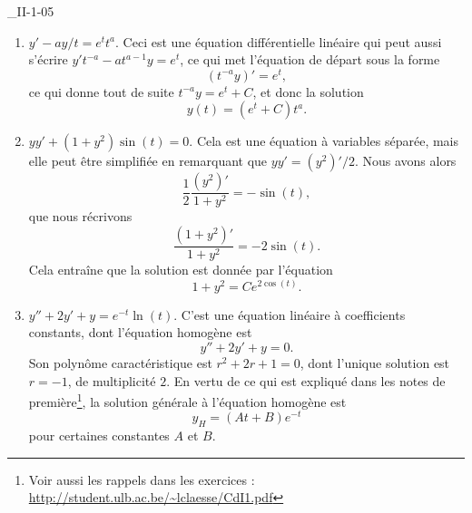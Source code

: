 \begin{corrige}{_II-1-05}
\begin{enumerate}
	\item $y'-ay/t=e^tt^a$.
Ceci est une équation différentielle linéaire qui peut aussi s'écrire $y't^{-a}-at^{a-1}y=e^t$, ce qui met l'équation de départ sous la forme
\begin{equation}
	(t^{-a}y)'=e^t,
\end{equation}
ce qui donne tout de suite $t^{-a}y=e^t+C$, et donc la solution
\begin{equation}
	y(t)=(e^t+C)t^a.
\end{equation}

	\item $yy'+(1+y^2)\sin(t)=0$.
Cela est une équation à variables séparée, mais elle peut être simplifiée en remarquant que $yy'=(y^2)'/2$. Nous avons alors
\begin{equation}
	\frac{ 1 }{2}\frac{ (y^2)' }{ 1+y^2 }=-\sin(t),
\end{equation}
que nous récrivons
\begin{equation}
	\frac{ (1+y^2)' }{ 1+y^2 }=-2\sin(t).
\end{equation}
Cela entraîne que la solution est donnée par l'équation
\begin{equation}
	1+y^2=C e^{2\cos(t)}.
\end{equation}

\item
$y''+2y'+y= e^{-t}\ln(t)$.
C'est une équation linéaire à coefficients constants, dont l'équation homogène est
\begin{equation}
	y''+2y'+y=0.
\end{equation}
Son polynôme caractéristique est $r^2+2r+1=0$, dont l'unique solution est $r=-1$, de multiplicité $2$. En vertu de ce qui est expliqué dans les notes de première\footnote{Voir aussi les rappels dans les exercices : \url{http://student.ulb.ac.be/~lclaesse/CdI1.pdf}}, la solution générale à l'équation homogène est 
\begin{equation}
	y_H=(At+B) e^{-t}
\end{equation}
pour certaines constantes $A$ et $B$. 


\end{enumerate}
\end{corrige}
